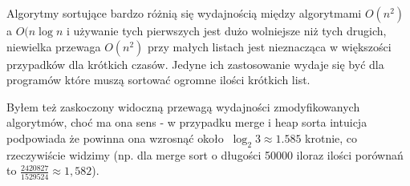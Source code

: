 \documentclass{article}
\begin{document}
Algorytmy sortujące bardzo różnią się wydajnością między algorytmami \(O(n^2)\) a \(O(n\log{n}\) i używanie tych pierwszych jest dużo wolniejsze niż tych drugich, niewielka przewaga \(O(n^2)\) przy małych listach jest nieznacząca w większości przypadków dla krótkich czasów. Jedyne ich zastosowanie wydaje się być dla programów które muszą sortować ogromne ilości krótkich list.

Byłem też zaskoczony widoczną przewagą wydajności zmodyfikowanych algorytmów, choć ma ona sens - w przypadku merge i heap sorta intuicja podpowiada że powinna ona wzrosnąć około \(\ \log_2{3}\approx1.585\) krotnie, co rzeczywiście widzimy (np. dla merge sort o długości 50000 iloraz ilości porównań to \( \frac{2420827}{1529524}\approx1,582\)).
\end{document}
